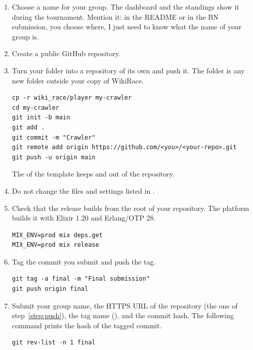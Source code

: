 \documentclass{article}
\begin{document}
\begin{enumerate}
    \item Choose a name for your group. The dashboard and the standings show it during the
    tournament. Mention it: in the README or in the BN submission, you choose where, I just 
    need to know what the name of your group is.

    \item Create a public GitHub repository.

    \item\label{step:push} Turn your  folder into a repository of its own
    and push it. The folder  is any new folder outside your copy of
    WikiRace.
\begin{lstlisting}[style=shell]
cp -r wiki_race/player my-crawler
cd my-crawler
git init -b main
git add .
git commit -m "Crawler"
git remote add origin https://github.com/<you>/<your-repo>.git
git push -u origin main
\end{lstlisting}
    The  of the template keeps  and  out of
    the repository.

    \item Do not change the files and settings listed in .

    \item Check that the release builds from the root of your repository. The platform
    builds it with Elixir 1.20 and Erlang/OTP 28.
\begin{lstlisting}[style=shell]
MIX_ENV=prod mix deps.get
MIX_ENV=prod mix release
\end{lstlisting}

    \item Tag the commit you submit and push the tag.
\begin{lstlisting}[style=shell]
git tag -a final -m "Final submission"
git push origin final
\end{lstlisting}

    \item Submit your group name, the HTTPS URL of the repository (the one of
    step~\ref{step:push}), the tag name (), and the commit hash. The
    following command prints the hash of the tagged commit.
\begin{lstlisting}[style=shell]
git rev-list -n 1 final
\end{lstlisting}
\end{enumerate}
\end{document}
